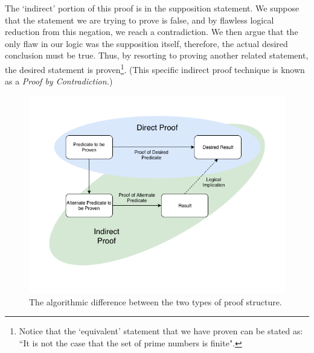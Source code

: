 The `indirect' portion of this proof is in the supposition statement. We suppose that the statement we are trying to prove is false, and by flawless logical reduction from this negation, we reach a contradiction. We then argue that the only flaw in our logic was the supposition itself, therefore, the actual desired conclusion must be true. Thus, by resorting to proving another related statement, the desired statement is proven\footnote{Notice that the `equivalent' statement that we have proven can be stated as: ``It is not the case that the set of prime numbers is finite".}. (This specific indirect proof technique is known as a \emph{Proof by Contradiction.})

\begin{figure}[h]
\centering
\includegraphics[scale=0.45]{res/direct_indirect.png}
\caption{The algorithmic difference between the two types of proof structure.}
\end{figure}
